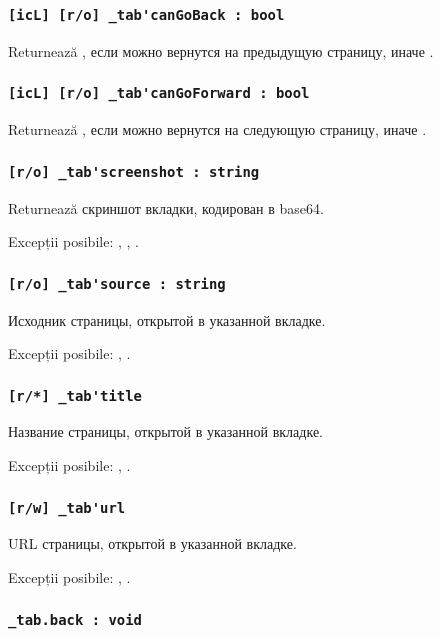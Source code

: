 \subsubsection{\lstinline|[icL] [r/o] _tab'canGoBack : bool|}

Returnează \true, если можно вернутся на предыдущую страницу, иначе \false.

\subsubsection{\lstinline|[icL] [r/o] _tab'canGoForward : bool|}

Returnează \true, если можно вернутся на следующую страницу, иначе \false.

\subsubsection{\lstinline|[r/o] _tab'screenshot : string|}

Returnează скриншот вкладки, кодирован в base64.

Excepții posibile: , , .

\subsubsection{\lstinline|[r/o] _tab'source : string|}

Исходник страницы, открытой в указанной вкладке.

Excepții posibile: , .

\subsubsection{\lstinline|[r/*] _tab'title|}

Название страницы, открытой в указанной вкладке.

Excepții posibile: , .

\subsubsection{\lstinline|[r/w] _tab'url|}

URL страницы, открытой в указанной вкладке.

Excepții posibile: , .

\subsubsection{\lstinline|_tab.back : void|}

